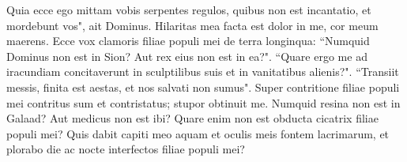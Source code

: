 \begin{biblechapter}
\verse Quia ecce ego mittam vobis serpentes regulos, quibus non est incantatio, et mordebunt vos", ait Dominus. 
\verse Hilaritas mea facta est dolor in me, cor meum maerens. 
\verse Ecce vox clamoris filiae populi mei de terra longinqua: “Numquid Dominus non est in Sion? Aut rex eius non est in ea?". “Quare ergo me ad iracundiam concitaverunt in sculptilibus suis et in vanitatibus alienis?". 
\verse “Transiit messis, finita est aestas, et nos salvati non sumus". 
\verse Super contritione filiae populi mei contritus sum et contristatus; stupor obtinuit me. 
\verse Numquid resina non est in Galaad? Aut medicus non est ibi? Quare enim non est obducta cicatrix filiae populi mei? 
\verse Quis dabit capiti meo aquam et oculis meis fontem lacrimarum, et plorabo die ac nocte interfectos filiae populi mei? 
\end{biblechapter}

